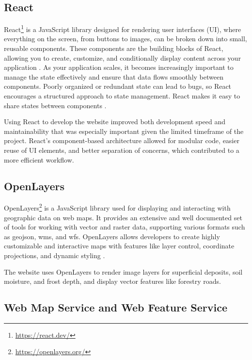 \subsection{React}\label{subsec:implementation:technologies:react}

React\footnote{\url{https://react.dev/}} is a JavaScript library designed for rendering user interfaces (UI), where everything on the screen, from buttons to images, can be broken down into small, reusable components. These components are the building blocks of React, allowing you to create, customize, and conditionally display content across your application \cite{react_component}. As your application scales, it becomes increasingly important to manage the state effectively and ensure that data flows smoothly between components. Poorly organized or redundant state can lead to bugs, so React encourages a structured approach to state management. React makes it easy to share states between components \cite{react_managing_state}. 

Using React to develop the website improved both development speed and maintainability that was especially important given the limited timeframe of the project. React's component-based architecture allowed for modular code, easier reuse of UI elements, and better separation of concerns, which contributed to a more efficient workflow.

\subsection{OpenLayers}

OpenLayers\footnote{\url{https://openlayers.org/}} is a JavaScript library used for displaying and interacting with geographic data on web maps. It provides an extensive and well documented set of tools for working with vector and raster data, supporting various formats such as \Gls{geojson}, \Gls{wms}, and \Gls{wfs}. OpenLayers allows developers to create highly customizable and interactive maps with features like layer control, coordinate projections, and dynamic styling \cite{openlayers}.

The website uses OpenLayers to render image layers for \gls{superficial deposit}s, soil moisture, and \gls{frost} depth, and display vector features like forestry roads.  

\subsection{Web Map Service and Web Feature Service}

